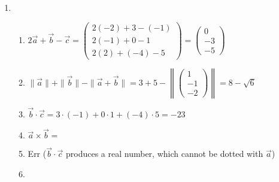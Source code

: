 \begin{enumerate}
\item \begin{enumerate}
\item $2\vec{a} + \vec{b} - \vec{c} = \begin{pmatrix} 2(-2) + 3 - (-1) \\ 2(-1) + 0 - 1 \\ 2(2) + (-4) - 5 \end{pmatrix} = \begin{pmatrix} 0 \\ -3 \\ -5 \end{pmatrix}$
\item $\|\vec{a}\| + \|\vec{b}\| - \|\vec{a} + \vec{b}\| = 3 + 5 - \left\|\begin{pmatrix} 1 \\ -1 \\ -2 \end{pmatrix}\right\| = 8 - \sqrt{6}$
\item $\vec{b}\cdot\vec{c} = 3\cdot (-1) + 0\cdot 1 + (-4)\cdot 5 = -23$
\item $\vec{a}\times\vec{b} = $
\item Err ($\vec{b}\cdot\vec{c}$ produces a real number, which cannot be dotted with $\vec{a}$)
\item 
\end{enumerate}
\end{enumerate}